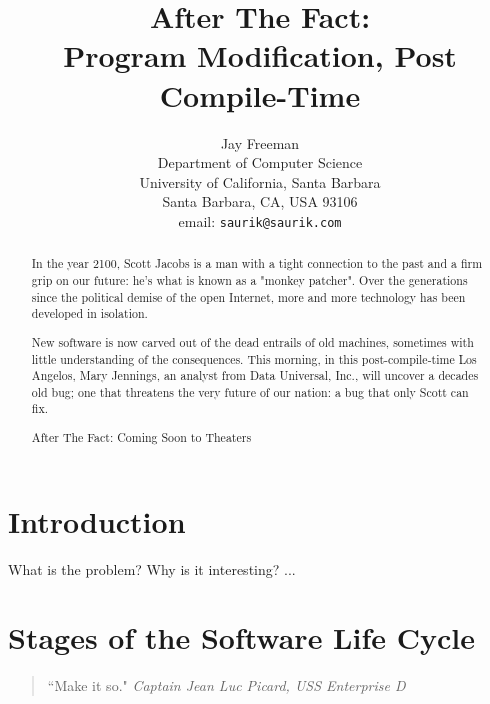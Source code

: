 \documentclass[12pt]{article}
\begin{document}
\date{}

\title{After The Fact: \\ Program Modification, Post Compile-Time}

\author{Jay Freeman
    \\ Department of Computer Science
    \\ University of California, Santa Barbara
    \\ Santa Barbara, CA, USA 93106
    \\ email: {\tt saurik@saurik.com} %
}

\maketitle %


\begin{abstract}
In the year 2100, Scott Jacobs is a man with a tight connection to the past and a firm grip on our future: he's what is known as a "monkey patcher". Over the generations since the political demise of the open Internet, more and more technology has been developed in isolation.

New software is now carved out of the dead entrails of old machines, sometimes with little understanding of the consequences. This morning, in this post-compile-time Los Angelos, Mary Jennings, an analyst from Data Universal, Inc., will uncover a decades old bug; one that threatens the very future of our nation: a bug that only Scott can fix.

After The Fact: Coming Soon to Theaters
\end{abstract}

\section{Introduction}

What is the problem? Why is it interesting? ...

\section{Stages of the Software Life Cycle}

\begin{quote}
\begin{small}
    ``Make it so."
\emph{Captain Jean Luc Picard, USS Enterprise D}
\end{small}
\end{quote}
\end{document}
